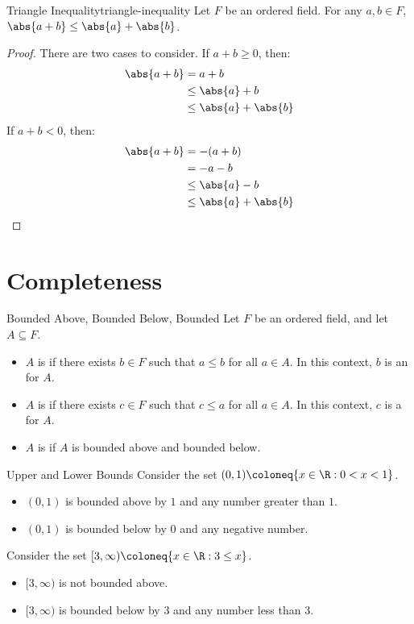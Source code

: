\begin{thmbox}{Triangle Inequality}{triangle-inequality}
    Let $F$ be an ordered field. For any $a,b \in F$, $\abs{a+b} \leq \abs{a} + \abs{b}$.
    \tcblower
    \begin{proof}
        There are two cases to consider. If $a+b \geq 0$, then:
        \begin{align*}
            \abs{a+b}
            &= a+b \\
            &\leq \abs{a} + b \\
            &\leq \abs{a} + \abs{b}
        \end{align*}
        If $a+b < 0$, then:
        \begin{align*}
            \abs{a+b}
            &= -(a+b) \\
            &= -a-b \\
            &\leq \abs{a} - b \\
            &\leq \abs{a} + \abs{b}
        \end{align*}
    \end{proof}
\end{thmbox}

\section{Completeness}

\begin{dfnbox}{Bounded Above, Bounded Below, Bounded}{}
    Let $F$ be an ordered field, and let $A \subseteq F$.
    \begin{itemize}[noitemsep]
        \item $A$ is  if there exists $b \in F$ such that $a \leq b$ for all $a \in A$. In this context, $b$ is an  for $A$.
        \item $A$ is  if there exists $c \in F$ such that $c \leq a$ for all $a \in A$. In this context, $c$ is a  for $A$.
        \item $A$ is  if $A$ is bounded above and bounded below.
    \end{itemize}
\end{dfnbox}

\begin{exbox}{Upper and Lower Bounds}{}
    Consider the set $ (0,1) \coloneq \{ x \in \R : 0<x<1\}$.
    \begin{itemize}[noitemsep]
        \item $(0,1)$ is bounded above by $1$ and any number greater than $1$.
        \item $(0,1)$ is bounded below by $0$ and any negative number.
    \end{itemize}
    Consider the set $[3, \infty) \coloneq \{ x \in \R : 3 \leq x \}$.
    \begin{itemize}[noitemsep]
        \item $[3, \infty)$ is not bounded above.
        \item $[3, \infty)$ is bounded below by $3$ and any number less than $3$.
    \end{itemize}
\end{exbox}

